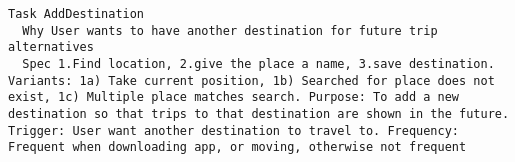 
\begin{lstlisting}
Task AddDestination
  Why User wants to have another destination for future trip alternatives
  Spec 1.Find location, 2.give the place a name, 3.save destination. Variants: 1a) Take current position, 1b) Searched for place does not exist, 1c) Multiple place matches search. Purpose: To add a new destination so that trips to that destination are shown in the future. Trigger: User want another destination to travel to. Frequency: Frequent when downloading app, or moving, otherwise not frequent

\end{lstlisting}